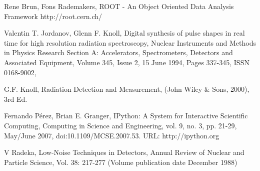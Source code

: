 \documentclass[twocolumn,preprintnumbers,superscriptaddress,amsmath,amssymb,floatfix]{revtex4-1}
\begin{document}
\begin{thebibliography}{99}

Rene Brun, Fons Rademakers, 
ROOT - An Object Oriented Data Analysis Framework
http://root.cern.ch/

 Valentin T. Jordanov, Glenn F. Knoll, Digital synthesis of pulse shapes in real time for high resolution radiation spectroscopy, Nuclear Instruments and Methods in Physics Research Section A: Accelerators, Spectrometers, Detectors and Associated Equipment, Volume 345, Issue 2, 15 June 1994, Pages 337-345, ISSN 0168-9002, 

 G.F. Knoll, Radiation Detection and Measurement, (John Wiley \& Sons, 2000), 3rd Ed.

Fernando Pérez, Brian E. Granger, IPython: A System for Interactive Scientific Computing, Computing in Science and Engineering, vol. 9, no. 3, pp. 21-29, May/June 2007, doi:10.1109/MCSE.2007.53. URL: http://ipython.org

V Radeka, Low-Noise Techniques in Detectors, Annual Review of Nuclear and Particle Science, Vol. 38: 217-277 (Volume publication date December 1988)






\end{thebibliography}
\end{document}
